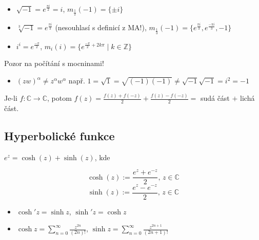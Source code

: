 \begin{example}
\begin{itemize}
    \item $\sqrt{-1}=e^{\frac{\pi i}{2}}=i$,  $m_{\frac{1}{2}}(-1)=\{\pm i\}$
    \item $\sqrt[3]{-1}=e^{\frac{\pi i}{3}}$ (nesouhlasí s definicí z MA!),  $m_{\frac{1}{3}}(-1)=\{e^{\frac{\pi i}{3}},e^{\frac{-\pi i}{3}},-1\} $
    \item  $i^i=e^{\frac{-\pi }{2}}$, 
    $m_{i}(i)=\{e^{\frac{-\pi }{2}+2k\pi}\mid k\in\mathbb{Z}\}$
\end{itemize}

 \vspace{5mm}
 Pozor na počítání s mocninami!%
 \begin{itemize}
    \item$(zw)^{\alpha}\neq z^{\alpha}w^{\alpha}$ \newline
 např. $1=\sqrt{1}=\sqrt{(-1)(-1)}\neq \sqrt{-1}\sqrt{-1}=i^2=-1$
 \end{itemize}
\end{example}

\begin{note}
Je-li $f \colon \mathbb{C} \to \mathbb{C}$, potom $f(z)=\frac{f(z)+f(-z)}{2}+\frac{f(z)-f(-z)}{2}=$ sudá část $+$ lichá část.
\end{note}

\subsection{Hyperbolické funkce}

$e^{z}=\cosh(z)+\sinh(z)$, kde

\begin{definition}
\[\cosh(z):=\frac{e^{z}+e^{-z}}{2}\text{, }z\in \mathbb{C}\] \newline
\[\sinh(z):=\frac{e^{z}-e^{-z}}{2}\text{, }z\in \mathbb{C}\]
\end{definition}


\begin{properties}
\mbox{}
\vspace{-2em}
\begin{itemize}
    \item $\cosh'{z}=\sinh{z}$, $\sinh'{z}=\cosh{z}$
    \item $\cosh{z}=\sum_{n=0}^{\infty}\frac{z^{2n}}{(2n)!}$, $\sinh{z}=\sum_{n=0}^{\infty}\frac{z^{2n+1}}{(2n+1)!}$
\end{itemize}
\end{properties}

